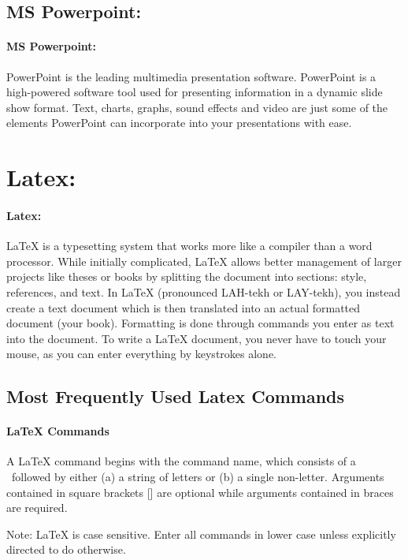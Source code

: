 \documentclass{article}
\begin{document}
\subsection{MS Powerpoint:}
\paragraph{MS Powerpoint:}
PowerPoint is the leading multimedia presentation software. PowerPoint is a high-powered software tool used for presenting information in a dynamic slide show format. Text, charts, graphs, sound effects and video are just some of the elements PowerPoint can incorporate into your presentations with ease. 



\newpage
\section{Latex:}
\paragraph{Latex:}

 LaTeX is a typesetting system that works more like a compiler than a word processor. While initially complicated, LaTeX allows better management of larger projects like theses or books by splitting the document into sections: style, references, and text. In LaTeX (pronounced LAH-tekh or LAY-tekh), you instead create a text document which is then translated into an actual formatted document (your book). Formatting is done through commands you enter as text into the document. To write a LaTeX document, you never have to touch your mouse, as you can enter everything by keystrokes alone.


\subsection{Most Frequently Used Latex Commands}

\paragraph{LaTeX Commands}

A LaTeX command begins with the command name, which consists of a \ followed by either (a) a string of letters or (b) a single non-letter. Arguments contained in square brackets [] are optional while arguments contained in braces {} are required.

Note: LaTeX is case sensitive. Enter all commands in lower case unless explicitly directed to do otherwise.
\end{document}
